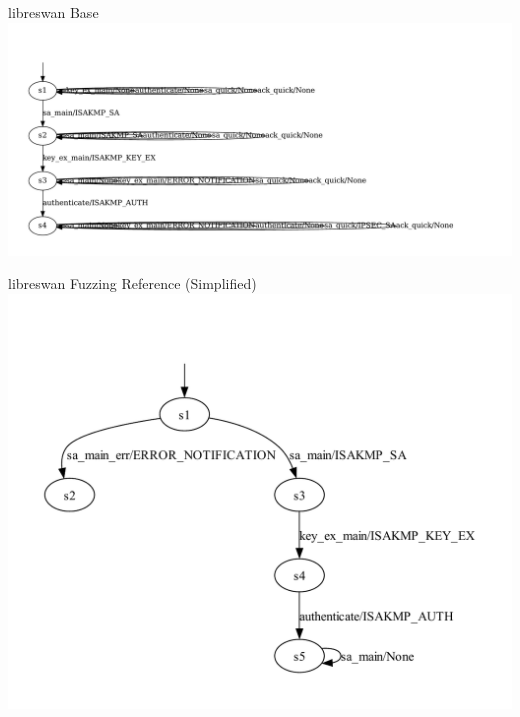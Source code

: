 \documentclass[aspectratio=169, xcolor=table]{beamer}
\begin{document}
\begin{frame}{libreswan Base}
	\vspace{-3em}
	\centering
	\includegraphics[height=0.9\textheight, trim={8em 0 0 0}]{models/LearnedModelLibreSimple.pdf}
\end{frame}

\begin{frame}{libreswan Fuzzing Reference (Simplified)}
	\vspace{-4em}
	\centering
	\includegraphics[height=1.0\textheight, trim={8em 0 0 0}]{models/LearnedModelLibreReference}
\end{frame}
\end{document}
